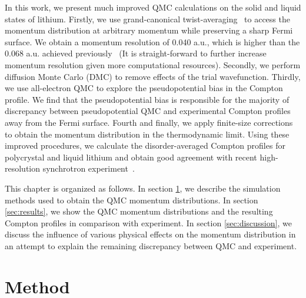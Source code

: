 In this work, we present much improved QMC calculations on the solid and liquid states of lithium. Firstly, we use grand-canonical twist-averaging~\cite{Lin2001,Holzmann2016} to access the momentum distribution at arbitrary momentum while preserving a sharp Fermi surface. We obtain a momentum resolution of 0.040 a.u., which is higher than the 0.068 a.u. achieved previously~\cite{Filippi1999} (It is straight-forward to further increase momentum resolution given more computational resources). Secondly, we perform diffusion Monte Carlo (DMC) to remove effects of the trial wavefunction. Thirdly, we use all-electron QMC to explore the pseudopotential bias in the Compton profile. We find that the pseudopotential bias is responsible for the majority of discrepancy between pseudopotential QMC and experimental Compton profiles away from the Fermi surface. Fourth and finally, we apply finite-size corrections~\cite{Holzmann2009,Holzmann2011} to obtain the momentum distribution in the thermodynamic limit. Using these improved procedures, we calculate the disorder-averaged Compton profiles for polycrystal and liquid lithium and obtain good agreement with recent high-resolution synchrotron experiment~\cite{Nozomu2019}.

This chapter is organized as follows. In section \ref{sec:method}, we describe the simulation methods used to obtain the QMC momentum distributions. In section \ref{sec:results}, we show the QMC momentum distributions and the resulting Compton profiles in comparison with experiment. In section \ref{sec:discussion}, we discuss the influence of various physical effects on the momentum distribution in an attempt to explain the remaining discrepancy between QMC and experiment.

\section{Method} \label{sec:method}

